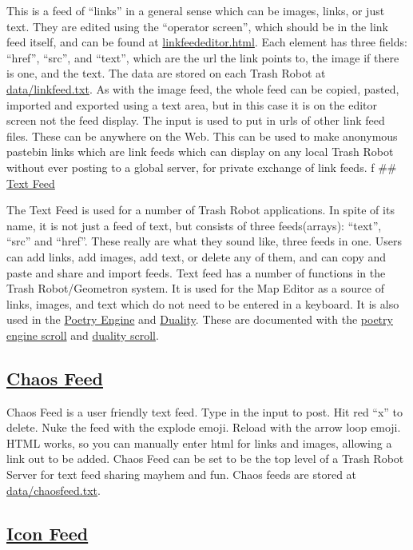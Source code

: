 This is a feed of ``links'' in a general sense which can be images,
links, or just text. They are edited using the ``operator screen'',
which should be in the link feed itself, and can be found at
\url{linkfeededitor.html}. Each element has three fields: ``href'',
``src'', and ``text'', which are the url the link points to, the image
if there is one, and the text. The data are stored on each Trash Robot
at \url{data/linkfeed.txt}. As with the image feed, the whole feed can
be copied, pasted, imported and exported using a text area, but in this
case it is on the editor screen not the feed display. The input is used
to put in urls of other link feed files. These can be anywhere on the
Web. This can be used to make anonymous pastebin links which are link
feeds which can display on any local Trash Robot without ever posting to
a global server, for private exchange of link feeds. f \#\#
\href{textfeed.html}{Text Feed}

The Text Feed is used for a number of Trash Robot applications. In spite
of its name, it is not just a feed of text, but consists of three
feeds(arrays): ``text'', ``src'' and ``href''. These really are what
they sound like, three feeds in one. Users can add links, add images,
add text, or delete any of them, and can copy and paste and share and
import feeds. Text feed has a number of functions in the Trash
Robot/Geometron system. It is used for the Map Editor as a source of
links, images, and text which do not need to be entered in a keyboard.
It is also used in the \href{poetryengine.html}{Poetry Engine} and
\href{duality.html}{Duality}. These are documented with the
\href{scrolls/poetryengine}{poetry engine scroll} and
\href{scrolls/duality}{duality scroll}.

\subsection{\texorpdfstring{\href{chaosfeed.html}{Chaos
Feed}}{Chaos Feed}}\label{chaos-feed}

Chaos Feed is a user friendly text feed. Type in the input to post. Hit
red ``x'' to delete. Nuke the feed with the explode emoji. Reload with
the arrow loop emoji. HTML works, so you can manually enter html for
links and images, allowing a link out to be added. Chaos Feed can be set
to be the top level of a Trash Robot Server for text feed sharing mayhem
and fun. Chaos feeds are stored at \url{data/chaosfeed.txt}.

\subsection{\texorpdfstring{\href{iconfeed.html}{Icon
Feed}}{Icon Feed}}\label{icon-feed}

